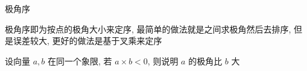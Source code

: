 \begin{frame}[fragile]{极角序}
	\label{basic2d:ssec:argord}

	极角序即为按点的极角大小来定序, 最简单的做法就是之间求极角然后去排序, 但是误差较大, 更好的做法是基于叉乘来定序

	设向量 \(a,b\) 在同一个象限, 若 \(a\times b<0\), 则说明 \(a\) 的极角比 \(b\) 大
\end{frame}
